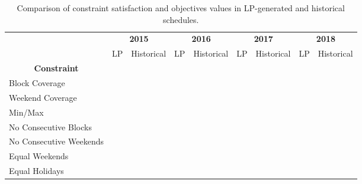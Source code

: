 \begin{sidewaystable}[htbp]
    \centering
    \caption{Comparison of constraint satisfaction and objectives values in LP-generated and historical schedules.}%
    \label{tbl:constraints-comparison}
		\begin{tabular}{l|cc|cc|cc|cc}
      \toprule
			\multirow{2}[1]{*}{}                                & \multicolumn{2}{c|}{\textbf{2015}} & \multicolumn{2}{c|}{\textbf{2016}} & \multicolumn{2}{c|}{\textbf{2017}} & \multicolumn{2}{c}{\textbf{2018}} \\
			                                                    &     LP     &      Historical       &     LP     &      Historical       &     LP     &      Historical       &     LP     &      Historical      \\ \midrule
			\multicolumn{1}{c|}{\textbf{Constraint}}            &            &                       &            &                       &            &                       &            &                      \\ \midrule
			Block Coverage                                      & \checkmark &      \checkmark       & \checkmark &      \checkmark       & \checkmark &      \checkmark       & \checkmark &      \checkmark      \\
			Weekend Coverage                                    & \checkmark &      \checkmark       & \checkmark &      \checkmark       & \checkmark &      \checkmark       & \checkmark &      \checkmark      \\
			Min/Max                                             & \checkmark &      \checkmark       & \checkmark &      \checkmark       & \checkmark &      \checkmark       & \checkmark &      \checkmark      \\
			No Consecutive Blocks                               & \checkmark &                       & \checkmark &                       & \checkmark &                       & \checkmark &                      \\
			No Consecutive Weekends                             & \checkmark &                       & \checkmark &                       & \checkmark &      \checkmark       & \checkmark &      \checkmark      \\
			Equal Weekends                                      & \checkmark &                       & \checkmark &                       & \checkmark &                       & \checkmark &                      \\
			Equal Holidays                                      & \checkmark &                       & \checkmark &      \checkmark       & \checkmark &                       & \checkmark &      \checkmark      \\ \midrule

\end{tabular}
\end{sidewaystable}
